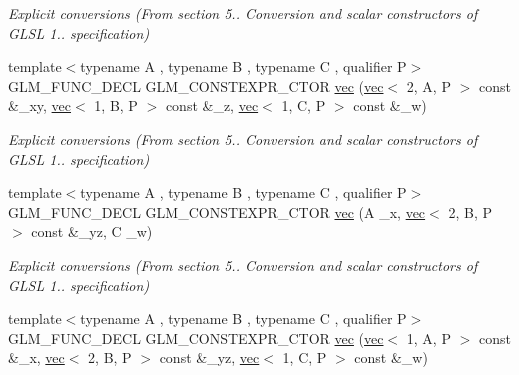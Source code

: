 \begin{DoxyCompactItemize}
\begin{DoxyCompactList}\small\item\em Explicit conversions (From section 5.. Conversion and scalar constructors of G\+L\+SL 1.. specification) \end{DoxyCompactList}\item 
\mbox{\label{structglm_1_1vec_3_014_00_01T_00_01Q_01_4_ae72bf7baa584d35cfadd6d3be750518b}} 
{\footnotesize template$<$typename A , typename B , typename C , qualifier P$>$ }\\G\+L\+M\+\_\+\+F\+U\+N\+C\+\_\+\+D\+E\+CL G\+L\+M\+\_\+\+C\+O\+N\+S\+T\+E\+X\+P\+R\+\_\+\+C\+T\+OR \hyperlink{structglm_1_1vec_3_014_00_01T_00_01Q_01_4_ae72bf7baa584d35cfadd6d3be750518b}{vec} (\hyperlink{structglm_1_1vec}{vec}$<$ 2, A, P $>$ const \&\+\_\+xy, \hyperlink{structglm_1_1vec}{vec}$<$ 1, B, P $>$ const \&\+\_\+z, \hyperlink{structglm_1_1vec}{vec}$<$ 1, C, P $>$ const \&\+\_\+w)
\begin{DoxyCompactList}\small\item\em Explicit conversions (From section 5.. Conversion and scalar constructors of G\+L\+SL 1.. specification) \end{DoxyCompactList}\item 
\mbox{\label{structglm_1_1vec_3_014_00_01T_00_01Q_01_4_a888477e1cf2c8bf5418e99450ea850c1}} 
{\footnotesize template$<$typename A , typename B , typename C , qualifier P$>$ }\\G\+L\+M\+\_\+\+F\+U\+N\+C\+\_\+\+D\+E\+CL G\+L\+M\+\_\+\+C\+O\+N\+S\+T\+E\+X\+P\+R\+\_\+\+C\+T\+OR \hyperlink{structglm_1_1vec_3_014_00_01T_00_01Q_01_4_a888477e1cf2c8bf5418e99450ea850c1}{vec} (A \+\_\+x, \hyperlink{structglm_1_1vec}{vec}$<$ 2, B, P $>$ const \&\+\_\+yz, C \+\_\+w)
\begin{DoxyCompactList}\small\item\em Explicit conversions (From section 5.. Conversion and scalar constructors of G\+L\+SL 1.. specification) \end{DoxyCompactList}\item 
\mbox{\label{structglm_1_1vec_3_014_00_01T_00_01Q_01_4_ab79395a0ba268369e6c49872b4385b27}} 
{\footnotesize template$<$typename A , typename B , typename C , qualifier P$>$ }\\G\+L\+M\+\_\+\+F\+U\+N\+C\+\_\+\+D\+E\+CL G\+L\+M\+\_\+\+C\+O\+N\+S\+T\+E\+X\+P\+R\+\_\+\+C\+T\+OR \hyperlink{structglm_1_1vec_3_014_00_01T_00_01Q_01_4_ab79395a0ba268369e6c49872b4385b27}{vec} (\hyperlink{structglm_1_1vec}{vec}$<$ 1, A, P $>$ const \&\+\_\+x, \hyperlink{structglm_1_1vec}{vec}$<$ 2, B, P $>$ const \&\+\_\+yz, \hyperlink{structglm_1_1vec}{vec}$<$ 1, C, P $>$ const \&\+\_\+w)

\end{DoxyCompactItemize}
